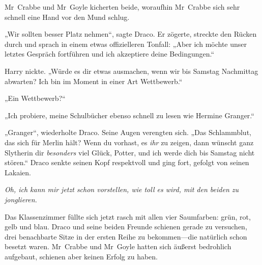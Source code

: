 Mr~Crabbe und Mr~Goyle kicherten beide, woraufhin Mr~Crabbe sich sehr schnell eine Hand vor den Mund schlug.

„Wir sollten besser Platz nehmen“, sagte Draco. Er zögerte, streckte den Rücken durch und sprach in einem etwas offizielleren Tonfall: „Aber ich möchte unser letztes Gespräch fortführen und ich akzeptiere deine Bedingungen.“

Harry nickte. „Würde es dir etwas ausmachen, wenn wir bis Samstag Nachmittag abwarten? Ich bin im Moment in einer Art Wettbewerb.“

„Ein Wettbewerb?“

„Ich probiere, meine Schulbücher ebenso schnell zu lesen wie Hermine Granger.“

„Granger“, wiederholte Draco. Seine Augen verengten sich. „Das Schlammblut, das sich für Merlin hält? Wenn du vorhast, es \emph{ihr} zu zeigen, dann wünscht ganz Slytherin dir \emph{besonders} viel Glück, Potter, und ich werde dich bis Samstag nicht stören.“ Draco senkte seinen Kopf respektvoll und ging fort, gefolgt von seinen Lakaien.

\emph{Oh, ich kann mir jetzt schon vorstellen, wie toll es wird, mit den beiden zu jonglieren.}

Das Klassenzimmer füllte sich jetzt rasch mit allen vier Saumfarben: grün, rot, gelb und blau. Draco und seine beiden Freunde schienen gerade zu versuchen, drei benachbarte Sitze in der ersten Reihe zu bekommen—die natürlich schon besetzt waren. Mr~Crabbe und Mr~Goyle hatten sich äußerst bedrohlich aufgebaut, schienen aber keinen Erfolg zu haben.

